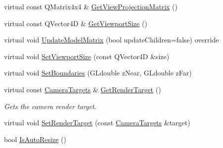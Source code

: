 \begin{DoxyCompactItemize}
\item 
virtual const Q\+Matrix4x4 \& \mbox{\hyperlink{class_geometry_engine_1_1_geometry_world_item_1_1_geometry_camera_1_1_camera_a22afa49db8d7aa71d24b9fed728ab381}{Get\+View\+Projection\+Matrix}} ()
\item 
virtual const Q\+Vector4D \& \mbox{\hyperlink{class_geometry_engine_1_1_geometry_world_item_1_1_geometry_camera_1_1_camera_a633facf8168c7bc943e256732cfb78dc}{Get\+Viewport\+Size}} ()
\item 
virtual void \mbox{\hyperlink{class_geometry_engine_1_1_geometry_world_item_1_1_geometry_camera_1_1_camera_afe7145a1edb13ce3a50c2964f5c865e9}{Update\+Model\+Matrix}} (bool update\+Children=false) override
\item 
virtual void \mbox{\hyperlink{class_geometry_engine_1_1_geometry_world_item_1_1_geometry_camera_1_1_camera_a96954629a05eba955adc1dff2df1fbdb}{Set\+Viewport\+Size}} (const Q\+Vector4D \&size)
\item 
virtual void \mbox{\hyperlink{class_geometry_engine_1_1_geometry_world_item_1_1_geometry_camera_1_1_camera_acf991463c9975a3b0dd047bb73a7dc95}{Set\+Boundaries}} (G\+Ldouble z\+Near, G\+Ldouble z\+Far)
\item 
\mbox{\label{class_geometry_engine_1_1_geometry_world_item_1_1_geometry_camera_1_1_camera_a51085794e61f854eba2ddc8fe9227f32}} 
virtual const \mbox{\hyperlink{namespace_geometry_engine_1_1_geometry_world_item_1_1_geometry_camera_a3766848bae97ff8203fa26907ac359ef}{Camera\+Targets}} \& \mbox{\hyperlink{class_geometry_engine_1_1_geometry_world_item_1_1_geometry_camera_1_1_camera_a51085794e61f854eba2ddc8fe9227f32}{Get\+Render\+Target}} ()
\begin{DoxyCompactList}\small\item\em Gets the camera render target. \end{DoxyCompactList}\item 
virtual void \mbox{\hyperlink{class_geometry_engine_1_1_geometry_world_item_1_1_geometry_camera_1_1_camera_a4a36e63be866e42068e479bb8eb7c957}{Set\+Render\+Target}} (const \mbox{\hyperlink{namespace_geometry_engine_1_1_geometry_world_item_1_1_geometry_camera_a3766848bae97ff8203fa26907ac359ef}{Camera\+Targets}} \&target)
\item 
bool \mbox{\hyperlink{class_geometry_engine_1_1_geometry_world_item_1_1_geometry_camera_1_1_camera_a48e1e7bfc2aea19d21ecf5a311815740}{Is\+Auto\+Resize}} ()
\item 

\end{DoxyCompactItemize}
